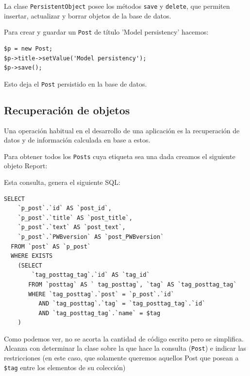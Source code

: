 La clase \verb'PersistentObject' posee los métodos \verb'save' y \verb'delete', que permiten insertar, actualizar y borrar objetos de la base de datos.

Para crear y guardar un \verb'Post' de título 'Model persistency' hacemos:

\begin{verbatim}
$p = new Post;
$p->title->setValue('Model persistency');
$p->save();
\end{verbatim}

Esto deja el \verb'Post' persistido en la base de datos.

\subsection{Recuperación de objetos}

Una operación habitual en el desarrollo de una aplicación es la recuperación de datos y de información calculada en base a estos.


Para obtener todos los \verb"Posts" cuya etiqueta sea una dada creamos el siguiente objeto Report:

\begin{lgrind}

\end{lgrind}

Esta consulta, genera el siguiente SQL:

\begin{verbatim}
SELECT
    `p_post`.`id` AS `post_id`,
    `p_post`.`title` AS `post_title`,
    `p_post`.`text` AS `post_text`,
    `p_post`.`PWBversion` AS `post_PWBversion`
  FROM `post` AS `p_post`
  WHERE EXISTS
    (SELECT
        `tag_posttag_tag`.`id` AS `tag_id`
       FROM `posttag` AS ` tag_posttag`, `tag` AS `tag_posttag_tag`
       WHERE `tag_posttag`.`post` = `p_post`.`id`
          AND `tag_posttag`.`tag` = `tag_posttag_tag`.`id`
          AND `tag_posttag_tag`.`name` = $tag
    )
\end{verbatim}


Como podemos ver, no se acorta la cantidad de código escrito pero se simplifica. Alcanza con determinar la clase sobre la que hace la consulta (\verb"Post") e indicar las restricciones (en este caso, que solamente queremos aquellos Post que posean a \verb'$tag' entre los elementos de su colección) %

